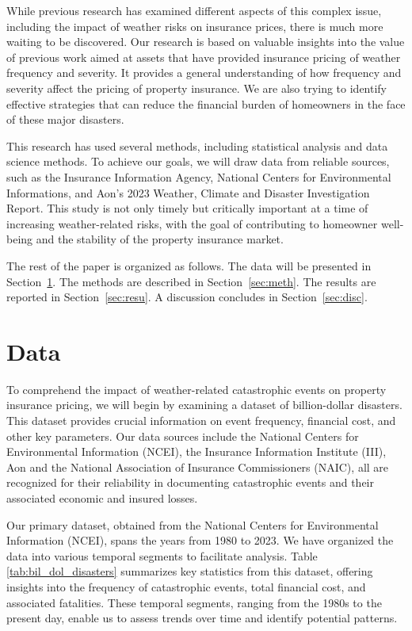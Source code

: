\documentclass[12pt]{article}
\begin{document}
While previous research has examined different aspects of this complex issue, including the impact of weather risks on insurance 
prices, there is much more waiting to be discovered. Our research is based on valuable insights into the value of previous work 
\cite{hurricaneco} aimed at assets that have provided insurance pricing of weather frequency and severity. It provides a general 
understanding of how frequency and severity affect the pricing of property insurance. We are also trying to identify effective 
strategies that can reduce the financial burden of homeowners in the face of these major disasters.


This research has used several methods, including statistical analysis and data science methods. To achieve our goals, we will draw 
data from reliable sources, such as the Insurance Information Agency, National Centers for Environmental Informations, and Aon's 2023 
Weather, Climate and Disaster Investigation Report. This study is not only timely but critically important at a time of increasing 
weather-related risks, with the goal of contributing to homeowner well-being and the stability of the property insurance market.

The rest of the paper is organized as follows.
The data will be presented in Section~\ref{sec:data}.
The methods are described in Section~\ref{sec:meth}.
The results are reported in Section~\ref{sec:resu}.
A discussion concludes in Section~\ref{sec:disc}.


\section{Data}
\label{sec:data}
To comprehend the impact of weather-related catastrophic events on property insurance pricing, we will begin by examining a dataset of 
billion-dollar disasters. This dataset provides crucial information on event frequency, financial cost, and other key parameters. Our 
data sources include the National Centers for Environmental Information (NCEI)\citep{ncei}, the Insurance Information Institute 
(III)\citep{iii}, Aon\citep{aon} and the National Association of Insurance Commissioners (NAIC)\citep{naic}, all are recognized for their 
reliability in documenting catastrophic events and their associated economic and insured losses.

Our primary dataset, obtained from the National Centers for Environmental Information (NCEI)\citep{ncei}, spans the years from 1980 to 
2023. We have organized the data into various temporal segments to facilitate analysis. Table \ref{tab:bil_dol_disasters} 
summarizes key statistics from this dataset, offering insights into the frequency of catastrophic events, total financial cost, and 
associated fatalities. These temporal segments, ranging from the 1980s to the present day, enable us to assess trends over time and 
identify potential patterns.
\end{document}
